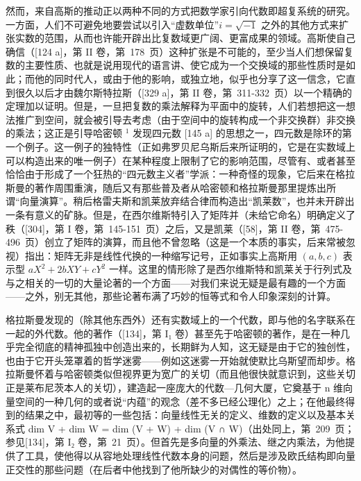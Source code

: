 然而，来自高斯的推动正以两种不同的方式把数学家引向代数即超复系统的研究。一方面，人们不可避免地要尝试以引入“虚数单位”\(i = \sqrt{-1}\) 之外的其他方式来扩张实数的范围，从而也许能开辟出比复数域更广阔、更富成果的领域。高斯使自己确信（{[}124 a{]}，第 II 卷，第~178~页）这种扩张是不可能的，至少当人们想保留复数的主要性质、也就是说用现代的语言讲、使它成为一个交换域的那些性质时是如此；而他的同时代人，或由于他的影响，或独立地，似乎也分享了这一信念，它直到很久以后才由魏尔斯特拉斯（{[}329 a{]}，第 II 卷，第~311-332~页）以一个精确的定理加以证明。但是，一旦把复数的乘法解释为平面中的旋转，人们若想把这一想法推广到空间，就会被引导去考虑（由于空间中的旋转构成一个非交换群）非交换的乘法；这正是引导哈密顿 \(^{1}\) 发现四元数 {[}145 a{]} 的思想之一，四元数是除环的第一个例子。这一例子的独特性（正如弗罗贝尼乌斯后来所证明的，它是在实数域上可以构造出来的唯一例子）在某种程度上限制了它的影响范围，尽管有、或者甚至恰恰由于形成了一个狂热的“四元数主义者”学派：一种奇怪的现象，它后来在格拉斯曼的著作周围重演，随后又有那些普及者从哈密顿和格拉斯曼那里提炼出所谓“向量演算”。稍后格雷夫斯和凯莱放弃结合律而构造出“凯莱数”，也并未开辟出一条有意义的矿脉。但是，在西尔维斯特引入了矩阵并（未给它命名）明确定义了秩（{[}304{]}，第 I 卷，第~145-151~页）之后，又是凯莱（{[}58{]}，第 II 卷，第~475-496~页）创立了矩阵的演算，而且他不曾忽略（这是一个本质的事实，后来常被忽视）指出：矩阵无非是线性代换的一种缩写记号，正如事实上高斯用 \((a, b, c)\) 表示型 \(aX^2 + 2bXY + cY^2\) 一样。这里的情形除了是西尔维斯特和凯莱关于行列式及与之相关的一切的大量论著的一个方面——对我们来说无疑是最有趣的一个方面——之外，别无其他，那些论著布满了巧妙的恒等式和令人印象深刻的计算。

格拉斯曼发现的（除其他东西外）还有实数域上的一个代数，即与他的名字联系在一起的外代数。他的著作（{[}134{]}，第 I₁ 卷）甚至先于哈密顿的著作，是在一种几乎完全彻底的精神孤独中创造出来的，长期鲜为人知，这无疑是由于它的独创性，也由于它开头笼罩着的哲学迷雾——例如这迷雾一开始就使默比乌斯望而却步。格拉斯曼怀着与哈密顿类似但视界更为宽广的关切（而且他很快就意识到，这些关切正是莱布尼茨本人的关切），建造起一座庞大的代数—几何大厦，它奠基于 n 维向量空间的一种几何的或者说“内蕴”的观念（差不多已经公理化）之上；在他最终得到的结果之中，最初等的一些包括：向量线性无关的定义、维数的定义以及基本关系式 dim V + dim W = dim (V + W) + dim (V ∩ W)（出处同上，第~209~页；参见{[}134{]}，第 I₂ 卷，第~21~页）。但首先是多向量的外乘法、继之内乘法，为他提供了工具，使他得以从容地处理线性代数本身的问题，然后是涉及欧氏结构即向量正交性的那些问题（在后者中他找到了他所缺少的对偶性的等价物）。

